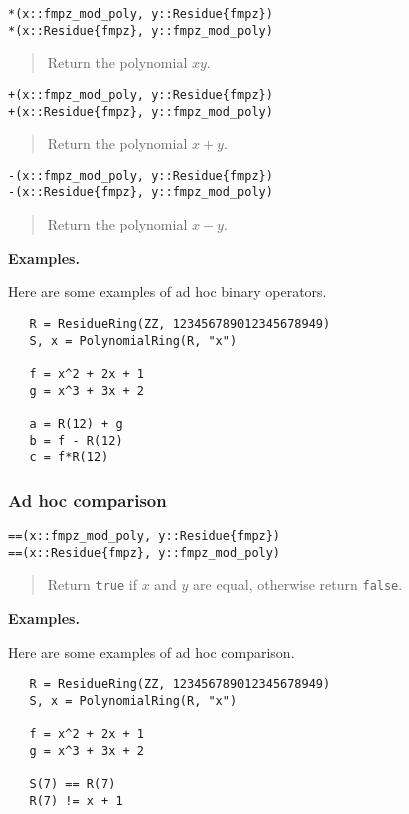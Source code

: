 \documentclass[a4paper,10pt]{article}
\newcommand{\code}{\lstinline}
\newcommand{\desc}[1]{\vspace{-3mm}\begin{quote}#1\end{quote}}
\begin{document}
{{\begin{lstlisting}
*(x::fmpz_mod_poly, y::Residue{fmpz})
*(x::Residue{fmpz}, y::fmpz_mod_poly)
\end{lstlisting}

\desc{Return the polynomial $xy$.}

\begin{lstlisting}
+(x::fmpz_mod_poly, y::Residue{fmpz})
+(x::Residue{fmpz}, y::fmpz_mod_poly)
\end{lstlisting}

\desc{Return the polynomial $x + y$.}

\begin{lstlisting}
-(x::fmpz_mod_poly, y::Residue{fmpz})
-(x::Residue{fmpz}, y::fmpz_mod_poly)
\end{lstlisting}

\desc{Return the polynomial $x - y$.}

\textbf{Examples.}

Here are some examples of ad hoc binary operators.

\begin{lstlisting}
   R = ResidueRing(ZZ, 123456789012345678949)
   S, x = PolynomialRing(R, "x")

   f = x^2 + 2x + 1
   g = x^3 + 3x + 2

   a = R(12) + g
   b = f - R(12)
   c = f*R(12)
\end{lstlisting}

\subsubsection{Ad hoc comparison}

\begin{lstlisting}
==(x::fmpz_mod_poly, y::Residue{fmpz})
==(x::Residue{fmpz}, y::fmpz_mod_poly)
\end{lstlisting}

\desc{Return \code{true} if $x$ and $y$ are equal, otherwise return \code{false}.}

\textbf{Examples.}

Here are some examples of ad hoc comparison.

\begin{lstlisting}
   R = ResidueRing(ZZ, 123456789012345678949)
   S, x = PolynomialRing(R, "x")

   f = x^2 + 2x + 1
   g = x^3 + 3x + 2

   S(7) == R(7)
   R(7) != x + 1
\end{lstlisting}

}}
\end{document}
